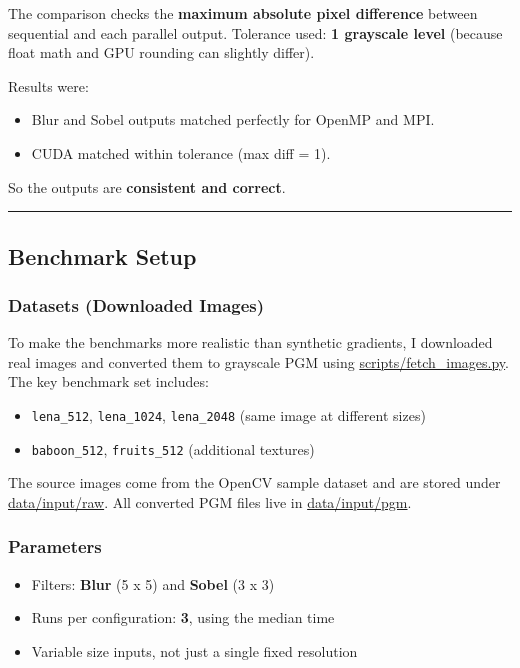 \documentclass[
]{article}
\providecommand{\tightlist}{%
  \setlength{\itemsep}{0pt}\setlength{\parskip}{0pt}}
\begin{document}
The comparison checks the \textbf{maximum absolute pixel difference}
between sequential and each parallel output. Tolerance used: \textbf{1
grayscale level} (because float math and GPU rounding can slightly
differ).

Results were:

\begin{itemize}
\tightlist
\item
  Blur and Sobel outputs matched perfectly for OpenMP and MPI.
\item
  CUDA matched within tolerance (max diff = 1).
\end{itemize}

So the outputs are \textbf{consistent and correct}.

\begin{center}\rule{0.5\linewidth}{0.5pt}\end{center}

\subsection{Benchmark Setup}\label{benchmark-setup}

\subsubsection{Datasets (Downloaded
Images)}\label{datasets-downloaded-images}

To make the benchmarks more realistic than synthetic gradients, I
downloaded real images and converted them to grayscale PGM using
\url{scripts/fetch_images.py}. The key benchmark set includes:

\begin{itemize}
\tightlist
\item
  \texttt{lena\_512}, \texttt{lena\_1024}, \texttt{lena\_2048} (same
  image at different sizes)
\item
  \texttt{baboon\_512}, \texttt{fruits\_512} (additional textures)
\end{itemize}

The source images come from the OpenCV sample dataset and are stored
under \url{data/input/raw}. All converted PGM files live in
\url{data/input/pgm}.

\subsubsection{Parameters}\label{parameters}

\begin{itemize}
\tightlist
\item
  Filters: \textbf{Blur} (5 x 5) and \textbf{Sobel} (3 x 3)
\item
  Runs per configuration: \textbf{3}, using the median time
\item
  Variable size inputs, not just a single fixed resolution
\end{itemize}
\end{document}
